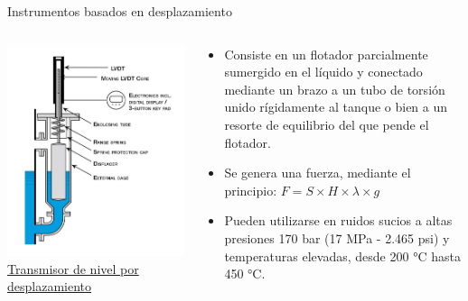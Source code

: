 \documentclass[aspectratio=169]{beamer}
\begin{document}
\begin{frame}{Instrumentos basados en desplazamiento}
    \begin{columns}[c, onlytextwidth]
        \begin{column}{0.45\textwidth}
        \centering
        \includegraphics[width = 0.8\linewidth]{fig/Nivel/Desplazamiento.jpg}\\
            \tiny{\href{https://www.magnetrol.com/es/transmisor-de-nivel-por-desplazador}{Transmisor de nivel por desplazamiento}}
        \end{column}
        \begin{column}{0.55\textwidth}
            \begin{itemize}
                \item Consiste en un flotador parcialmente sumergido en el líquido y conectado mediante un brazo a un tubo de torsión unido rígidamente al tanque o bien a un resorte de equilibrio del que pende el flotador.
                \item Se genera una fuerza, mediante el principio: $F=S\times H \times \lambda \times g$ 
                \item Pueden utilizarse en ruidos sucios a altas presiones 170 bar (17 MPa - 2.465 psi) y temperaturas elevadas, desde 200 °C hasta 450 °C.
    
            \end{itemize}
            
        \end{column}
    \end{columns}
\end{frame} 
\end{document}
